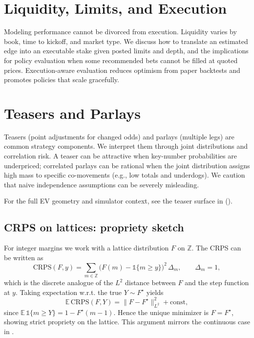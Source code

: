 \section{Liquidity, Limits, and Execution}
Modeling performance cannot be divorced from execution. Liquidity varies by book, time to kickoff, and market type. We discuss how to translate an estimated edge into an executable stake given posted limits and depth, and the implications for policy evaluation when some recommended bets cannot be filled at quoted prices. Execution-aware evaluation reduces optimism from paper backtests and promotes policies that scale gracefully.

\section{Teasers and Parlays}
Teasers (point adjustments for changed odds) and parlays (multiple legs) are common strategy components. We interpret them through joint distributions and correlation risk. A teaser can be attractive when key-number probabilities are underpriced; correlated parlays can be rational when the joint distribution assigns high mass to specific co-movements (e.g., low totals and underdogs). We caution that naive independence assumptions can be severely misleading.

For the full EV geometry and simulator context, see the teaser surface in  ().
\subsection{CRPS on lattices: propriety sketch}\label{subsec:crps-lattice}
For integer margins we work with a lattice distribution $F$ on $\mathbb Z$. The CRPS can be written as
\begin{equation}
\mathrm{CRPS}(F,y)=\sum_{m\in\mathbb Z} \big(F(m)-\mathbb 1\{m\ge y\}\big)^2\,\Delta_m,\qquad \Delta_m=1,
\end{equation}
which is the discrete analogue of the $L^2$ distance between $F$ and the step function at $y$. Taking expectation w.r.t. the true $Y\sim F^\star$ yields
\[\mathbb E\,\mathrm{CRPS}(F,Y)= \|F-F^\star\|_{L^2}^2 + \text{const},\]
since $\mathbb E\,\mathbb 1\{m\ge Y\}=1-F^\star(m-1)$. Hence the unique minimizer is $F=F^\star$, showing strict propriety on the lattice. This argument mirrors the continuous case in .

